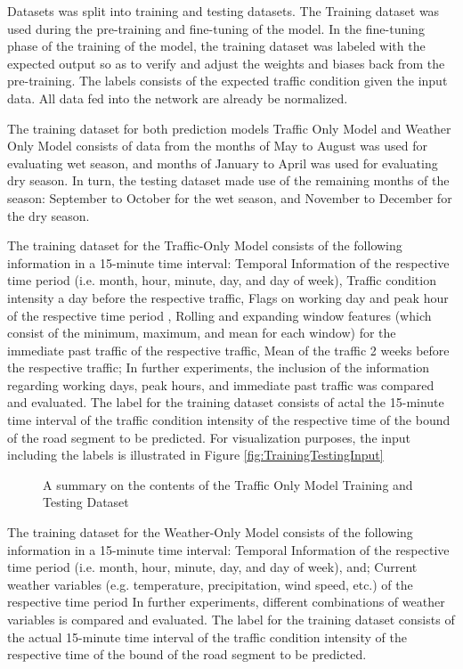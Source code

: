 Datasets was split into training and testing datasets. The Training dataset was used during the pre-training and fine-tuning of the model. In the fine-tuning phase of the training of the model, the training dataset was labeled with the expected output so as to verify and adjust the weights and biases back from the pre-training. The labels consists of the expected traffic condition given the input data. All data fed into the network are already be normalized. 

The training dataset for both prediction models Traffic Only Model and Weather Only Model consists of data from the months of May to August was used for evaluating wet season, and months of January to April was used for evaluating dry season. In turn, the testing dataset made use of the remaining months of the season: September to October for the wet season, and November to December for the dry season.  

The training dataset for the Traffic-Only Model consists of the following information in a 15-minute time interval: 
Temporal Information of the respective time period (i.e. month, hour, minute, day, and day of week),
Traffic condition intensity a day before the respective traffic,
Flags on working day and peak hour of the respective time period ,
Rolling and expanding window features (which consist of the minimum, maximum, and mean for each window) for the immediate past traffic of the respective traffic,
Mean of the traffic 2 weeks before the respective traffic;
In further experiments, the inclusion of the information regarding working days, peak hours, and immediate past traffic was compared and evaluated. The label for the training dataset consists of actal the 15-minute time interval of the traffic condition intensity of the respective time of the bound of the road segment to be predicted. For visualization purposes, the input including the labels is illustrated in Figure \ref{fig:TrainingTestingInput}


\begin{figure}
  \centering
  \captionsetup{justification=centering}
  \caption{A summary on the contents of the Traffic Only Model Training and Testing Dataset}
  \label{fig:TOM_TrainingTestingInput}
\end{figure}


The training dataset for the Weather-Only Model consists of the following information in a 15-minute time interval: 
Temporal Information of the respective time period (i.e. month, hour, minute, day, and day of week), and;
Current weather variables (e.g. temperature, precipitation, wind speed, etc.) of the respective time period
In further experiments, different combinations of weather variables is compared and evaluated. The label for the training dataset consists of the actual 15-minute time interval of the traffic condition intensity of the respective time of the bound of the road segment to be predicted. 


